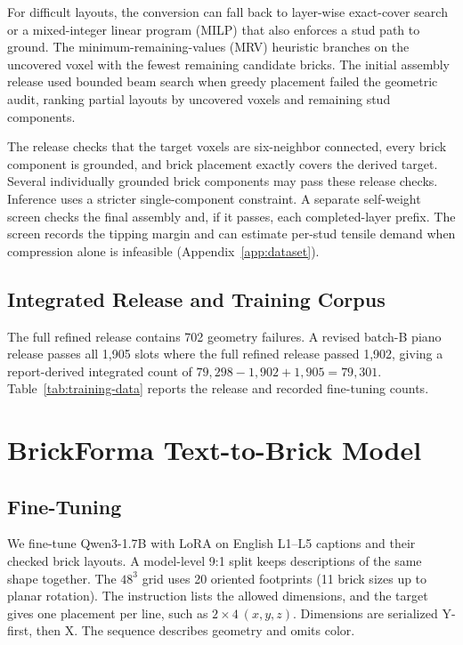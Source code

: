 \documentclass[letterpaper]{article} %
\begin{document}
For difficult layouts, the conversion can fall back to layer-wise exact-cover search or a mixed-integer linear program (MILP) that also enforces a stud path to ground. The minimum-remaining-values (MRV) heuristic branches on the uncovered voxel with the fewest remaining candidate bricks. The initial assembly release used bounded beam search when greedy placement failed the geometric audit, ranking partial layouts by uncovered voxels and remaining stud components.

The release checks that the target voxels are six-neighbor connected, every brick component is grounded, and brick placement exactly covers the derived target. Several individually grounded brick components may pass these release checks. Inference uses a stricter single-component constraint. A separate self-weight screen checks the final assembly and, if it passes, each completed-layer prefix. The screen records the tipping margin and can estimate per-stud tensile demand when compression alone is infeasible (Appendix~\ref{app:dataset}).

\subsection{Integrated Release and Training Corpus}
The full refined release contains 702 geometry failures. A revised batch-B piano release passes all 1,905 slots where the full refined release passed 1,902, giving a report-derived integrated count of $79{,}298-1{,}902+1{,}905=79{,}301$. Table~\ref{tab:training-data} reports the release and recorded fine-tuning counts.


\section{BrickForma Text-to-Brick Model}
\label{sec:model}
\subsection{Fine-Tuning}
\label{sec:training}
We fine-tune Qwen3-1.7B with LoRA on English L1--L5 captions and their checked brick layouts. A model-level 9:1 split keeps descriptions of the same shape together. The $48^3$ grid uses 20 oriented footprints (11 brick sizes up to planar rotation). The instruction lists the allowed dimensions, and the target gives one placement per line, such as $2{\times}4\ (x,y,z)$. Dimensions are serialized Y-first, then X. The sequence describes geometry and omits color.
\end{document}
